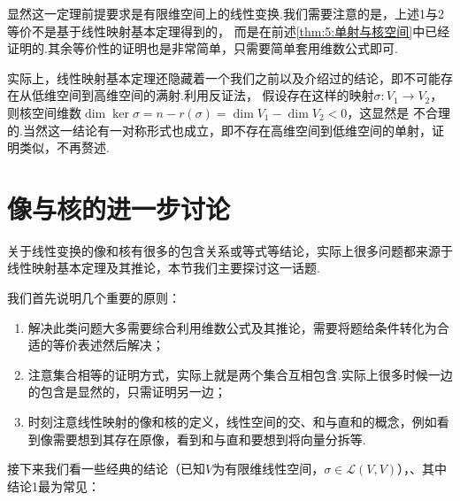 显然这一定理前提要求是有限维空间上的线性变换.我们需要注意的是，上述1与2等价不是基于线性映射基本定理得到的，
而是在前述\autoref{thm:5:单射与核空间}中已经证明的.其余等价性的证明也是非常简单，只需要简单套用维数公式即可.

实际上，线性映射基本定理还隐藏着一个我们之前以及介绍过的结论，即不可能存在从低维空间到高维空间的满射.利用反证法，
假设存在这样的映射$\sigma:V_1\to V_2$，则核空间维数$\dim\ker\sigma=n-r(\sigma)=\dim V_1-\dim V_2<0$，这显然是
不合理的.当然这一结论有一对称形式也成立，即不存在高维空间到低维空间的单射，证明类似，不再赘述.

\section{像与核的进一步讨论}
关于线性变换的像和核有很多的包含关系或等式等结论，实际上很多问题都来源于线性映射基本定理及其推论，本节我们主要探讨这一话题.

我们首先说明几个重要的原则：
\begin{enumerate}
    \item 解决此类问题大多需要综合利用维数公式及其推论，需要将题给条件转化为合适的等价表述然后解决；

    \item 注意集合相等的证明方式，实际上就是两个集合互相包含.实际上很多时候一边的包含是显然的，只需证明另一边；

    \item 时刻注意线性映射的像和核的定义，线性空间的交、和与直和的概念，例如看到像需要想到其存在原像，看到和与直和要想到将向量分拆等.
\end{enumerate}

接下来我们看一些经典的结论（已知$V$为有限维线性空间，$\sigma\in \mathcal{L}(V,V)$），、其中结论1最为常见：

